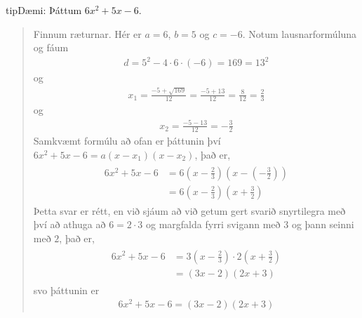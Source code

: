 \documentclass[a4paper,10pt,icelandic]{sphinxmanual}
\begin{document}
\begin{sphinxadmonition}{tip}{Dæmi:}
 Þáttum \(6x^2+5x-6\).
\begin{quote}

Finnum ræturnar. Hér er \(a=6\), \(b=5\) og \(c=-6\). Notum lausnarformúluna og fáum
\begin{equation*}
\begin{split}d = 5^2-4 \cdot 6 \cdot (-6) = 169 = 13^2\end{split}
\end{equation*}
og
\begin{equation*}
\begin{split}x_1 =\frac{-5+\sqrt{169}}{12}=\frac{-5+13}{12} =\frac{8}{12} =\frac{2}{3}\end{split}
\end{equation*}
og
\begin{equation*}
\begin{split}x_2=\frac{-5-13}{12}=-\frac{3}{2}\end{split}
\end{equation*}
Samkvæmt formúlu að ofan er þáttunin því \(6x^2+5x-6=a(x-x_1)(x-x_2)\), það er,
\begin{equation*}
\begin{split}\begin{aligned}
6x^2+5x-6&=6\left(x-\frac{2}{3}\right)\left(x-\left(-\frac{3}{2}\right)\right)\\
&=6\left(x-\frac{2}{3}\right)\left(x+\frac{3}{2}\right)
\end{aligned}\end{split}
\end{equation*}
Þetta svar er rétt, en við sjáum að við getum gert svarið snyrtilegra með því að athuga að \(6=2 \cdot 3\) og margfalda fyrri svigann með \(3\) og þann seinni með \(2\), það er,
\begin{equation*}
\begin{split}\begin{aligned}
6x^2+5x-6 &= 3 \left(x-\frac{2}{3}\right) \cdot 2\left(x+\frac{3}{2}\right)\\
&=(3x-2)(2x+3)
\end{aligned}\end{split}
\end{equation*}
svo þáttunin er
\begin{equation*}
\begin{split}6x^2+5x-6=(3x-2)(2x+3)\end{split}
\end{equation*}\end{quote}


\end{sphinxadmonition}
\end{document}
